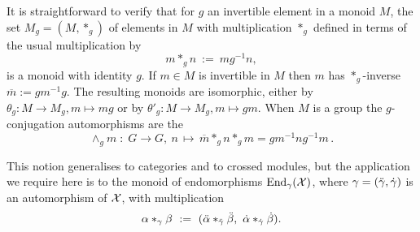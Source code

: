 \medskip 
It is straightforward to verify that for $g$ an invertible element 
in a monoid $M$, the set $M_g = (M,\ast_g)$ of elements in $M$ with 
multiplication $\ast_g$ defined in terms of the usual multiplication by
\begin{equation} \label{eq:star-g-defn} 
m \ast_g n ~:=~ mg^{-1}n, 
\end{equation} 
is a monoid with identity $g$. 
If $m \in M$ is invertible in $M$ then $m$ has $\ast_g$-inverse 
$\overline{m} := gm^{-1}g$. 
The resulting monoids are isomorphic, 
either by $\theta_g : M \to M_g, m \mapsto mg$ 
or by $\theta'_g : M \to M_g, m \mapsto gm$.  
When $M$ is a group the $g$-conjugation automorphisms are the  
\begin{equation} \label{eq:g-conj} 
\wedge_g m \;:\; G \to G,~ 
    n \,\mapsto\, \overline{m} \ast_g n \ast_g m = gm^{-1}ng^{-1}m\,. 
\end{equation} 

This notion generalises to categories and to crossed modules, 
but the application we require here is to the monoid of endomorphisms 
$\mathrm{End}_{\gamma}(\mathcal{X})$, 
where $\gamma = (\ddot{\gamma},\dot{\gamma})$ is an automorphism of $\mathcal{X}$, 
with multiplication 
\begin{equation} \label{eq:star-gamma-calX} 
\alpha\ast_{\gamma}\beta ~:=~ 
(\ddot{\alpha}\ast_{\ddot{\gamma}}\ddot{\beta},~ \dot{\alpha}\ast_{\dot{\gamma}}\dot{\beta}). 
\end{equation} 

